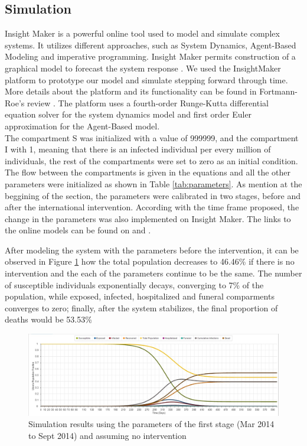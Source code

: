 \subsection{Simulation}
 Insight Maker is a powerful online tool used to model and simulate complex systems. It utilizes different approaches, such as System Dynamics, Agent-Based Modeling and imperative programming. Insight Maker permits  construction of a graphical model to forecast the system response \cite{FortmannRoe}. We used the InsightMaker platform to prototype our model and simulate stepping forward through time. More details about the platform and its functionality can be found in Fortmann-Roe's review \cite{FortmannRoe}. The platform uses a fourth-order Runge-Kutta differential equation solver for the system dynamics model and  first order Euler approximation for the Agent-Based model.\\

\noindent The compartment S was initialized with a value of 999999, and the compartment I with 1, meaning that there is an infected individual per every million of individuals, the rest of the compartments were set to zero as an initial condition. The flow between the compartments is given in the equations and all the other parameters were initialized as shown in Table \ref{tab:parameters}.  As mention at the beggining of the section, the parameters were calibrated in two stages, before and after the international intervention. According with the time frame proposed, the change in the parameters was also implemented on Insight Maker. The links to the online models can be found on \cite{IM_AI} and  \cite{IM_BI}.  


%
\noindent After modeling the system with the parameters before the intervention, it can be observed in Figure \ref{fig:LB_IM_NoIn} how the total population decreases to 46.46\%  if there is no intervention and the each of the parameters continue to be the same. The number of susceptible individuals exponentially decays, converging to 7\% of the population, while exposed, infected, hospitalized and funeral comparments converges to zero; finally, after the system stabilizes, the final proportion of deaths would be 53.53\% 

\begin{figure}[!h]
  \centering
  \includegraphics[width=1\textwidth]{LB_NoInt_SD_IM}
  \caption{Simulation results using the parameters of the first stage (Mar 2014  to Sept 2014) and assuming no intervention}
\label{fig:LB_IM_NoIn} 
\end{figure}

